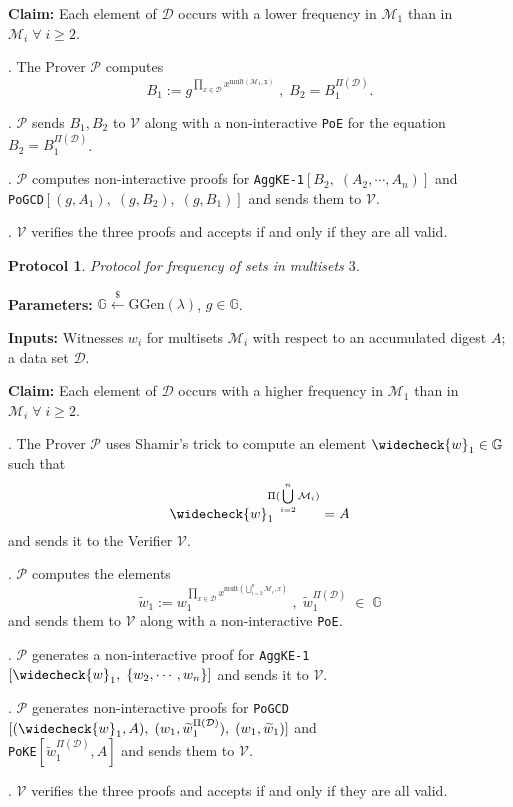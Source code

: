 \documentclass[11pt, lettersize, notitlepage, leqno, footskip=0.6cm]{article}
\newcommand{\pl}{\prod\limits}
\newcommand{\wti}{\widetilde}
\newcommand{\mc}{\mathcal}
\newcommand{\mb}{\mathbb}
\newcommand{\mr}{\mathrm}
\newcommand{\lamb}{\lambda}
\newcommand{\weck}{\widecheck}
\newcommand{\mP}{\mc{P}}
\newcommand{\V}{\mc{V}}
\newcommand{\vs}{\vspace{-0.15cm}}
\newcommand{\noin}{\noindent}
\newtheorem{Prot}[Thm]{Protocol}
\numberwithin{equation}{section}
\begin{document}
\noin \textbf{Claim:} Each element of $\mc{D}$ occurs with a lower frequency in $\mc{M}_1$ than in $\mc{M}_i\;\forall\;i\geq 2$.

\begin{prf1}\noin {}. The Prover $\mP$ computes \vs $$B_1:= g^{\pl_{x\in\mc{D}} x^{\mr{mult(\mc{M}_1, x)}}}\;,\; B_2 = B_1^{\Pi(\mc{D})}.$$

\noin 2. $\mP$ sends $B_1, B_2$ to $\V$ along with a non-interactive \verb|PoE| for the equation $B_2= B_1^{\Pi(\mc{D})}$.

\noin 3. $\mP$ computes non-interactive proofs for \verb|AggKE-1|$[B_2,\;(A_2,\cdots,A_n)]$ and\\ \verb|PoGCD|$[(g, A_1),\;(g, B_2),\;(g,B_1)]$ and sends them to $\V$.

\noin 4. $\V$ verifies the three proofs and accepts if and only if they are all valid.\end{prf1}


\bigskip

\begin{Prot} Protocol for frequency of sets in multisets $3$.\end{Prot} \vspace{-0.3cm}

\noin \textbf{Parameters:} $\mb{G}\xleftarrow{\$} \mr{GGen}(\lamb)$,\; $g\in \mb{G}$.

\noin \textbf{Inputs:} Witnesses $w_i$ for multisets $\mc{M}_i$ with respect to an accumulated digest $A$; a data set $\mc{D}$.

\noin \textbf{Claim:} Each element of $\mc{D}$ occurs with a higher frequency in $\mc{M}_1$ than in $\mc{M}_i\;\forall\;i\geq 2$.

\begin{prf1}\noin {}. The Prover $\mP$ uses Shamir's trick to compute an element $\weck{w}_1\in \mb{G}$ such that \vs $$\weck{w}_1 ^{\Pi(\bigcup\limits_{i=2}^n \mc{M}_i)} = A $$ and sends it to the Verifier $\V$.

\noin 2. $\mP$ computes the elements \vs $$\wti{w}_1:= w_1^{\pl_{x\in\mc{D}} x^{\mr{mult}(\bigcup\limits_{i=2}^n \mc{M}_i, x)}}\;,\; \wti{w}_1^{\Pi(\mc{D})}\;\in\;\mb{G}$$ and sends them to $\V$ along with a non-interactive \verb|PoE|.

\noin 3. $\mP$ generates a non-interactive proof for \verb|AggKE-1|$[\weck{w}_1,\;\{w_2,\cdots,w_n\}]$ and sends it to $\V$. 

\noin 4. $\mP$ generates non-interactive proofs for \verb|PoGCD|$[(\weck{w}_1, A),\;(w_1,\wti{w}_1^{\Pi(\mc{D})}),\;(w_1,\wti{w}_1)]$ and\\ \verb|PoKE|$[\wti{w}_1^{\Pi(\mc{D})},A]$ and sends them to $\V$.

\noin 5. $\V$ verifies the three proofs and accepts if and only if they are all valid.\end{prf1}
\end{document}
